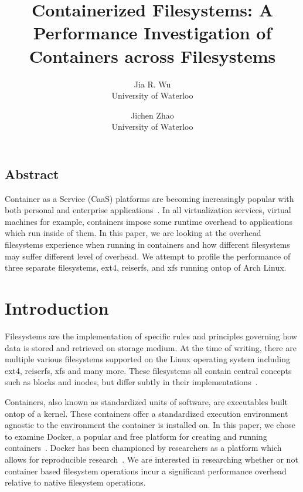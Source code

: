\documentclass[letterpaper,twocolumn,10pt]{article}
\begin{document}
\date{}

\title{\Large \bf Containerized Filesystems: A Performance Investigation of Containers across Filesystems}

\author{
{\rm Jia R. Wu}\\
University of Waterloo
\and
{\rm Jichen Zhao}\\
University of Waterloo
} %

\maketitle

\thispagestyle{empty}


\subsection*{Abstract}

Container as a Service (CaaS) platforms are becoming increasingly popular with both personal and enterprise applications~\cite{anderson2015docker}. In all virtualization services, virtual machines for example, containers impose some runtime overhead to applications which run inside of them. In this paper, we are looking at the overhead filesystems experience when running in containers and how different filesystems may suffer different level of overhead. We attempt to profile the performance of three separate filesystems, ext4, reiserfs, and xfs running ontop of Arch Linux.

\section{Introduction}
Filesystems are the implementation of specific rules and principles governing how data is stored and retrieved on storage medium. At the time of writing, there are multiple various filesystems supported on the Linux operating system including ext4, reiserfs, xfs and many more. These filesystems all contain central concepts such as blocks and inodes, but differ subtly in their implementations~\cite{TLDP}.

Containers, also known as standardized units of software, are executables built ontop of a kernel. These containers offer a standardized execution environment agnostic to the environment the container is installed on. In this paper, we chose to examine Docker, a popular and free platform for creating and running containers~\cite{rad2017introduction}. Docker has been championed by researchers as a platform which allows for reproducible research~\cite{boettiger2015introduction}. We are interested in researching whether or not container based filesystem operations incur a significant performance overhead relative to native filesystem operations.
\end{document}
